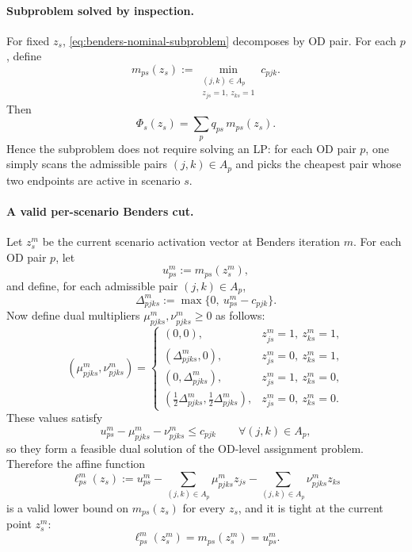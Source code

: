 \documentclass[11pt]{article}
\theoremstyle{definition}
\begin{document}
\paragraph{Subproblem solved by inspection.}
For fixed \(z_s\), \eqref{eq:benders-nominal-subproblem} decomposes by OD pair.
For each \(p\), define
\begin{equation}
	m_{ps}(z_s)
	:=
	\min_{\substack{(j,k)\in A_p\\ z_{js}=1,\ z_{ks}=1}}
	c_{pjk}.
	\label{eq:od-inspection-value}
\end{equation}
Then
\begin{equation}
	\Phi_s(z_s)=\sum_p q_{ps}\,m_{ps}(z_s).
	\label{eq:scenario-inspection-value}
\end{equation}
Hence the subproblem does not require solving an LP: for each OD pair \(p\), one
simply scans the admissible pairs \((j,k)\in A_p\) and picks the cheapest pair
whose two endpoints are active in scenario \(s\).

\paragraph{A valid per-scenario Benders cut.}
Let \(z_s^m\) be the current scenario activation vector at Benders iteration
\(m\). For each OD pair \(p\), let
\[
	u_{ps}^m := m_{ps}(z_s^m),
\]
and define, for each admissible pair \((j,k)\in A_p\),
\[
	\Delta_{pjks}^m := \max\{0,\ u_{ps}^m - c_{pjk}\}.
\]
Now define dual multipliers \(\mu_{pjks}^m,\nu_{pjks}^m\ge 0\) as follows:
\[
	(\mu_{pjks}^m,\nu_{pjks}^m)
	=
	\begin{cases}
		(0,0),               & z_{js}^m=1,\ z_{ks}^m=1, \\
		(\Delta_{pjks}^m,0), & z_{js}^m=0,\ z_{ks}^m=1, \\
		(0,\Delta_{pjks}^m), & z_{js}^m=1,\ z_{ks}^m=0, \\
		\left(\frac12\Delta_{pjks}^m,\frac12\Delta_{pjks}^m\right),
		                     & z_{js}^m=0,\ z_{ks}^m=0.
	\end{cases}
\]
These values satisfy
\[
	u_{ps}^m - \mu_{pjks}^m - \nu_{pjks}^m \le c_{pjk}
	\qquad \forall (j,k)\in A_p,
\]
so they form a feasible dual solution of the OD-level assignment problem.
Therefore the affine function
\begin{equation}
	\ell_{ps}^m(z_s)
	:=
	u_{ps}^m
	-
	\sum_{(j,k)\in A_p} \mu_{pjks}^m z_{js}
	-
	\sum_{(j,k)\in A_p} \nu_{pjks}^m z_{ks}
	\label{eq:od-affine-lower-bound}
\end{equation}
is a valid lower bound on \(m_{ps}(z_s)\) for every \(z_s\), and it is tight at
the current point \(z_s^m\):
\[
	\ell_{ps}^m(z_s^m)=m_{ps}(z_s^m)=u_{ps}^m.
\]
\end{document}
